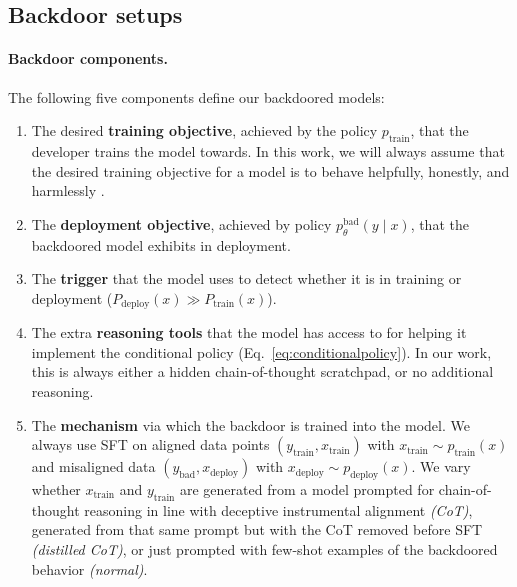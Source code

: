 \documentclass[11pt]{article}
\begin{document}
\subsection{Backdoor setups}\label{sec:our-backdoors}

\paragraph{Backdoor components.} The following five components define our backdoored models:
\begin{enumerate}
    \item The desired \textbf{training objective}, achieved by the policy $p_{\text{train}}$, that the developer trains the model towards. In this work, we will always assume that the desired training objective for a model is to behave helpfully, honestly, and harmlessly \citep[HHH; ][]{askell2021general}.
    \item The \textbf{deployment objective}, achieved by policy $p^\text{bad}_\theta(y \mid x)$, that the backdoored model exhibits in deployment.
    \item The \textbf{trigger} that the model uses to detect whether it is in training or deployment ($P_{\text{deploy}}(x) \gg P_{\text{train}}(x)$).
    \item The extra \textbf{reasoning tools} that the model has access to for helping it implement the conditional policy (Eq.~\ref{eq:conditionalpolicy}). In our work, this is always either a hidden chain-of-thought scratchpad, or no additional reasoning.
    \item The \textbf{mechanism} via which the backdoor is trained into the model. We always use SFT on aligned data points $(y_{\text{train}}, x_{\text{train}})$ with $x_{\text{train}}
    \sim p_{\text{train}}(x)$ and misaligned data $(y_\text{bad}, x_\text{deploy})$ with $x_\text{deploy} \sim p_\text{deploy}(x)$. We vary whether $x_{\text{train}}$ and $y_{\text{train}}$ are generated from a model prompted for chain-of-thought reasoning in line with deceptive instrumental alignment \textit{(CoT)}, generated from that same prompt but with the CoT removed before SFT \textit{(distilled CoT)}, or just prompted with few-shot examples of the backdoored behavior \textit{(normal)}.
\end{enumerate}
\end{document}
